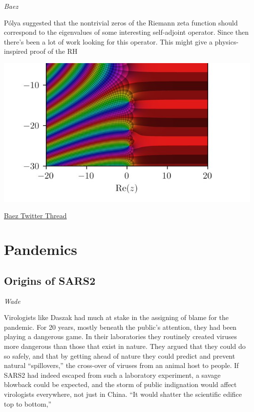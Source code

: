 \documentclass[
]{book}
\begin{document}
\emph{Baez}

Pólya suggested that the nontrivial zeros of the Riemann zeta function should correspond to the eigenvalues of some interesting self-adjoint operator. Since then there's been a lot of work looking for this operator. This might give a physics-inspired proof of the RH

\includegraphics{fig/riemann_zeta.jpeg}

\href{https://twitter.com/johncarlosbaez/status/1404119086062178307}{Baez Twitter Thread}

\hypertarget{pandemics}{%
\chapter{Pandemics}\label{pandemics}}

\hypertarget{origins-of-sars2}{%
\section{Origins of SARS2}\label{origins-of-sars2}}

\emph{Wade}

Virologists like Daszak had much at stake in the assigning of blame for the pandemic. For 20 years, mostly beneath the public's attention, they had been playing a dangerous game. In their laboratories they routinely created viruses more dangerous than those that exist in nature. They argued that they could do so safely, and that by getting ahead of nature they could predict and prevent natural ``spillovers,'' the cross-over of viruses from an animal host to people. If SARS2 had indeed escaped from such a laboratory experiment, a savage blowback could be expected, and the storm of public indignation would affect virologists everywhere, not just in China. ``It would shatter the scientific edifice top to bottom,''
\end{document}
